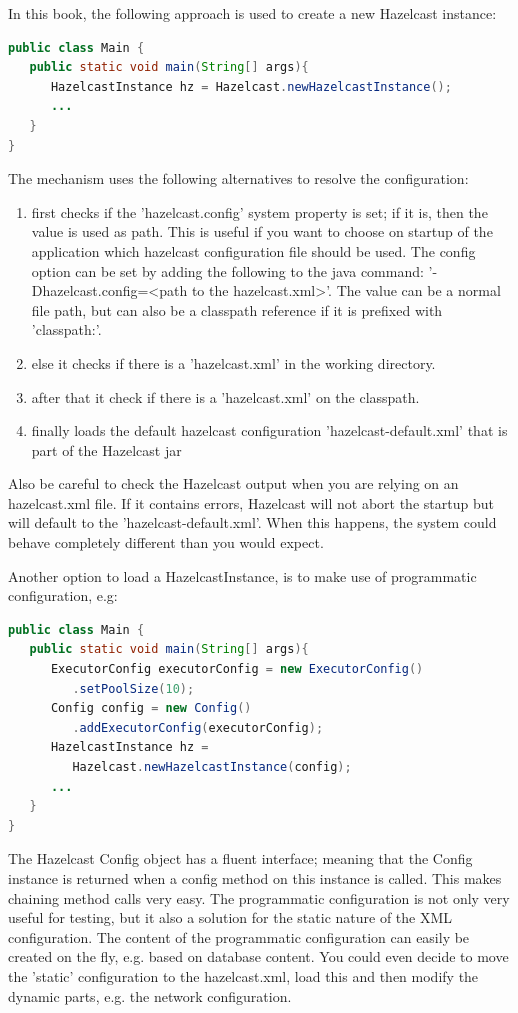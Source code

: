 In this book, the following approach is used to create a new Hazelcast instance:
\begin{lstlisting}[language=java]
public class Main {
   public static void main(String[] args){
      HazelcastInstance hz = Hazelcast.newHazelcastInstance();
      ...
   }
}
\end{lstlisting}
The mechanism uses the following alternatives to resolve the configuration:
\begin{enumerate}
\item first checks if the 'hazelcast.config' system property is set; if it is, then the value is used as path. This is useful if you want to choose on startup of the application which hazelcast configuration file should be used. The config option can be set by adding the following to the java command: '-Dhazelcast.config=<path to the hazelcast.xml>'. The value can be a normal file path, but can also be a classpath reference if it is prefixed with 'classpath:'. 
\item else it checks if there is a 'hazelcast.xml' in the working directory.
\item after that it check if there is a 'hazelcast.xml' on the classpath. 
\item finally loads the default hazelcast configuration 'hazelcast-default.xml' that is part of the Hazelcast jar
\end{enumerate}
Also be careful to check the Hazelcast output when you are relying on an hazelcast.xml file. If it contains errors, Hazelcast will not abort the startup but will default to the 'hazelcast-default.xml'. When this happens, the system could behave completely different than you would expect.

Another option to load a HazelcastInstance, is to make use of programmatic configuration, e.g: 
\begin{lstlisting}[language=java]
public class Main {
   public static void main(String[] args){
      ExecutorConfig executorConfig = new ExecutorConfig()
         .setPoolSize(10);
      Config config = new Config()
         .addExecutorConfig(executorConfig);	  
      HazelcastInstance hz = 
         Hazelcast.newHazelcastInstance(config);
      ...
   }
}
\end{lstlisting}
The Hazelcast Config object has a fluent interface; meaning that the Config instance is returned when a config method on this instance is called. This makes chaining method calls very easy. The programmatic configuration is not only very useful for testing, but it also a solution for the static nature of the XML configuration. The content of the programmatic configuration can easily be created on the fly, e.g. based on database content. You could even decide to move the 'static' configuration to the hazelcast.xml, load this and then modify the dynamic parts, e.g. the network configuration.

